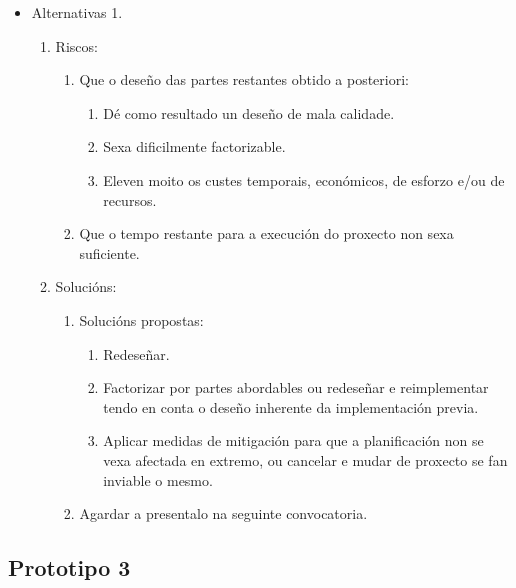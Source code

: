  \begin{itemize}
  \item Alternativas 1.
        \begin{enumerate}
         \item Riscos:
               \begin{enumerate}
                \item Que o deseño das partes restantes obtido a posteriori:
                      \begin{enumerate}
                       \item Dé como resultado un deseño de mala calidade.
                       \item Sexa dificilmente factorizable.
                       \item Eleven moito os custes temporais, económicos, de
                             esforzo e/ou de recursos.
                      \end{enumerate}
                \item Que o tempo restante para a execución do proxecto non
                      sexa suficiente.
               \end{enumerate}
         \item Solucións:
               \begin{enumerate}
                \item Solucións propostas:
                      \begin{enumerate}
                       \item Redeseñar.
                       \item Factorizar por partes abordables ou redeseñar e
                             reimplementar tendo en conta o deseño inherente da
                             implementación previa.
                       \item Aplicar medidas de mitigación para que a
                             planificación non se vexa afectada en extremo, ou
                             cancelar e mudar de proxecto se fan inviable o
                             mesmo.
                      \end{enumerate}
                \item Agardar a presentalo na seguinte convocatoria.
               \end{enumerate}
        \end{enumerate}
 \end{itemize}

 \subsection{Prototipo 3}

